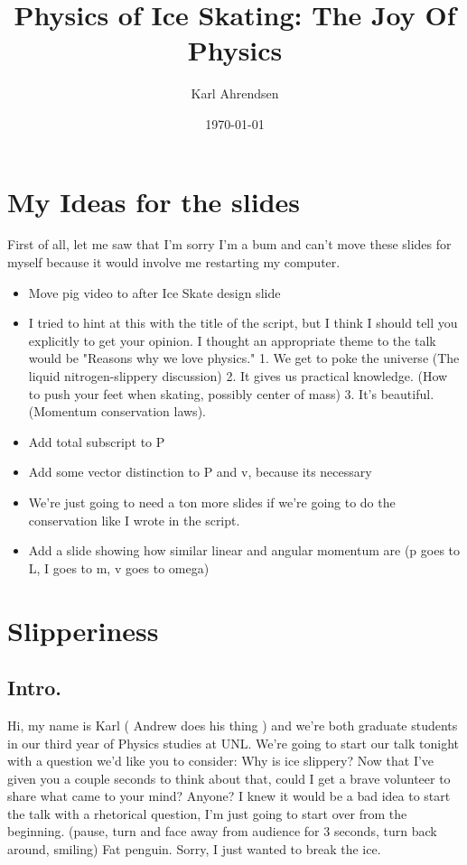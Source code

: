 \documentclass[12pt]{article}
\title{Physics of Ice Skating: The Joy Of Physics}
\author{Karl Ahrendsen}
\date{\today}
\begin{document}
\maketitle
\section*{My Ideas for the slides}
First of all, let me saw that I'm sorry I'm a bum and can't move these 
slides for myself because it would involve me restarting my computer. 
\begin{itemize}
    \item Move pig video to after Ice Skate design slide
    \item I tried to hint at this with the title of the script,
        but I think I should tell you explicitly to get your 
        opinion. I thought an appropriate theme to the talk 
        would be "Reasons why we love physics." 1. We
        get to poke the universe (The liquid nitrogen-slippery
        discussion) 2. It gives us practical knowledge. (How to 
        push your feet when skating, possibly center of mass) 
        3. It's beautiful. (Momentum conservation laws).
    \item Add total subscript to P
    \item Add some vector distinction to P and v, because its necessary
    \item We're just going to need a ton more slides if we're
        going to do the conservation like I wrote in the script. 
    \item Add a slide showing how similar linear and angular
        momentum are (p goes to L, I goes to m, v goes to omega)
\end{itemize}
\section{Slipperiness}
\subsection{Intro.}
Hi, my name is Karl ( Andrew does his thing ) and we're both graduate
students in our third year of Physics studies at UNL. 
We're going to start our talk tonight with a question we'd like you to consider:
Why is ice slippery? Now that I've given you a couple seconds to think about that, 
could I get a brave volunteer to share what came to your mind? Anyone? I knew it would
be a bad idea to start the talk with a rhetorical question, I'm just going to start 
over from the beginning. (pause, turn and face away from audience for 3 seconds, 
turn back around, smiling) Fat penguin. Sorry, I just wanted to break the ice. 
    
\end{document}
